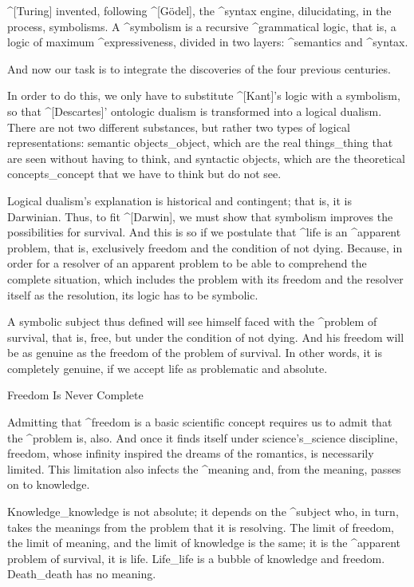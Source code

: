  ^[Turing] invented, following ^[Gödel], the ^{syntax
engine}, dilucidating, in the process, symbolisms. A ^{symbolism} is a
recursive ^{grammatical logic}, that is, a logic of maximum
^{expressiveness}, divided in two layers: ^{semantics} and ^{syntax}.

 And now our task is to integrate the discoveries of the
four previous centuries.

\noindent
In order to do this, we only have to substitute ^[Kant]'s logic with a
symbolism, so that ^[Descartes]' ontologic dualism is transformed into a
logical dualism. There are not two different substances, but rather two
types of logical representations: semantic objects_{object}, which are
the real things_{thing} that are seen without having to think, and
syntactic objects, which are the theoretical concepts_{concept} that we
have to think but do not see.
\endpoints

Logical dualism's explanation is historical and contingent; that is, it
is Darwinian. Thus, to fit ^[Darwin], we must show that symbolism
improves the possibilities for survival. And this is so if we postulate
that ^{life} is an ^{apparent problem}, that is, exclusively freedom and
the condition of not dying. Because, in order for a resolver of an
apparent problem to be able to comprehend the complete situation, which
includes the problem with its freedom and the resolver itself as the
resolution, its logic has to be symbolic.

A symbolic subject thus defined will see himself faced with the
^{problem of survival}, that is, free, but under the condition of not
dying. And his freedom will be as genuine as the freedom of the problem
of survival. In other words, it is completely genuine, if we accept life
as problematic and absolute.


\Section Freedom Is Never Complete

Admitting that ^{freedom} is a basic scientific concept requires us to
admit that the ^{problem} is, also. And once it finds itself under
science's_{science} discipline, freedom, whose infinity inspired the
dreams of the romantics, is necessarily limited. This limitation also
infects the ^{meaning} and, from the meaning, passes on to knowledge.


Knowledge_{knowledge} is not absolute; it depends on the ^{subject} who,
in turn, takes the meanings from the problem that it is resolving. The
limit of freedom, the limit of meaning, and the limit of knowledge is
the same; it is the ^{apparent problem} of survival, it is life.
Life_{life} is a bubble of knowledge and freedom. Death_{death} has no
meaning.

